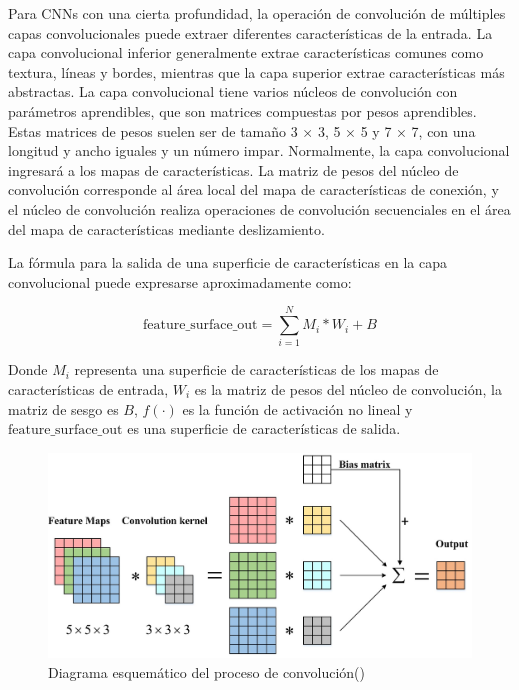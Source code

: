  Para CNNs con una cierta profundidad, la operación de convolución de múltiples capas convolucionales puede extraer diferentes características de la entrada. La capa convolucional inferior generalmente extrae características comunes como textura, líneas y bordes, mientras que la capa superior extrae características más abstractas. La capa convolucional tiene varios núcleos de convolución con parámetros aprendibles, que son matrices compuestas por pesos aprendibles. Estas matrices de pesos suelen ser de tamaño 3 × 3, 5 × 5 y 7 × 7, con una longitud y ancho iguales y un número impar. Normalmente, la capa convolucional ingresará a los mapas de características. La matriz de pesos del núcleo de convolución corresponde al área local del mapa de características de conexión, y el núcleo de convolución realiza operaciones de convolución secuenciales en el área del mapa de características mediante deslizamiento. 
 
 La fórmula para la salida de una superficie de características en la capa convolucional puede expresarse aproximadamente como:
 
 \[ \text{{feature\_surface\_out}} = \sum_{i=1}^{N} M_i * W_i + B \]
 
 Donde \( M_i \) representa una superficie de características de los mapas de características de entrada, \( W_i \) es la matriz de pesos del núcleo de convolución, la matriz de sesgo es \( B \), \( f(\cdot) \) es la función de activación no lineal y \( \text{{feature\_surface\_out}} \) es una superficie de características de salida.
 

 \begin{figure}[H]
 	\begin{center}
 		\includegraphics[width=1\textwidth]{2/figures/cnn1.jpeg}
 		\caption{Diagrama esquemático del proceso de convolución(\cite{tecnica2})}
 	\end{center}
 \end{figure}
 
